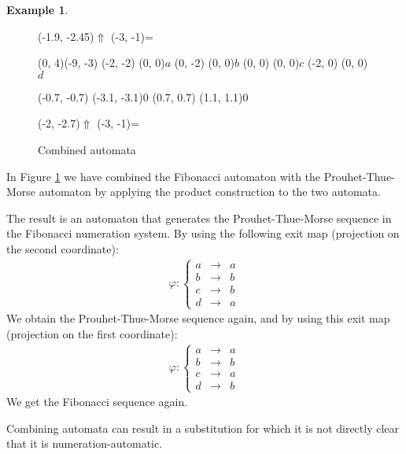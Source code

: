 \documentclass{article}
\theoremstyle{definition}
\newtheorem{example}[theorem]{Example}
\begin{document}
\begin{example}
\begin{figure}[H]
\begin{graph}
  \freetext(-1.9, -2.45){$\Uparrow$}
  \freetext(-3, -1){=}
\end{graph}
\begin{graph}(0, 4)(-9, -3)
  (-2, -2) (0, 0){$a$}
  (0, -2)  (0, 0){$b$}
  (0, 0) (0, 0){$c$}
  (-2, 0)  (0, 0){$d$}

  (-0.7, -0.7) \freetext(-3.1, -3.1){0}
   
   
  (0.7, 0.7) \freetext(1.1, 1.1){0}
   
   

  \freetext(-2, -2.7){$\Uparrow$}
  \freetext(-3, -1){=}
\end{graph}
\caption{Combined automata}
\label{fig:combined}
\end{figure}

In Figure \ref{fig:combined} we have combined the Fibonacci automaton with the 
Prouhet-Thue-Morse automaton by applying the product construction to the two 
automata.

The result is an automaton that generates the Prouhet-Thue-Morse sequence in 
the Fibonacci numeration system. By using the following exit map (projection
on the second coordinate):
\begin{eqnarray*}
\varphi: \left\{ \begin{array}{lll}
a &\rightarrow& a\\
b &\rightarrow& b\\
c &\rightarrow& b\\
d &\rightarrow& a
\end{array} \right.
\end{eqnarray*}
We obtain the Prouhet-Thue-Morse sequence again, and by using this exit map
(projection on the first coordinate):
\begin{eqnarray*}
\varphi: \left\{ \begin{array}{lll}
a &\rightarrow& a\\
b &\rightarrow& b\\
c &\rightarrow& a\\
d &\rightarrow& b
\end{array} \right.
\end{eqnarray*}
We get the Fibonacci sequence again.
\end{example}

Combining automata can result in a substitution for which it is not directly
clear that it is numeration-automatic. 
\end{document}
